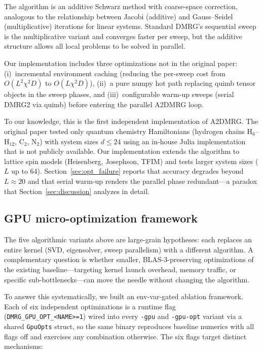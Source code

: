\documentclass[preprint,12pt]{elsarticle}
\begin{document}
The algorithm is an additive Schwarz method with coarse-space correction, analogous to the relationship between Jacobi (additive) and Gauss--Seidel (multiplicative) iterations for linear systems.
Standard DMRG's sequential sweep is the multiplicative variant and converges faster per sweep, but the additive structure allows all local problems to be solved in parallel.

Our implementation includes three optimizations not in the original paper:
(i)~incremental environment caching (reducing the per-sweep cost from $O(L^2 \chi^2 D)$ to $O(L \chi^2 D)$),
(ii)~a pure numpy hot path replacing quimb tensor objects in the sweep phases, and
(iii)~configurable warm-up sweeps (serial DMRG2 via quimb) before entering the parallel A2DMRG loop.

To our knowledge, this is the first independent implementation of A2DMRG.
The original paper \cite{Grigori2025} tested only quantum chemistry Hamiltonians (hydrogen chains H$_6$--H$_{12}$, C$_2$, N$_2$) with system sizes $d \leq 24$ using an in-house Julia implementation that is not publicly available.
Our implementation extends the algorithm to lattice spin models (Heisenberg, Josephson, TFIM) and tests larger system sizes ($L$ up to 64).
Section~\ref{sec:opt_failure} reports that accuracy degrades beyond $L \approx 20$ and that serial warm-up renders the parallel phase redundant---a paradox that Section~\ref{sec:discussion} analyzes in detail.

\subsection{GPU micro-optimization framework}
\label{sec:opt_framework}

The five algorithmic variants above are large-grain hypotheses: each replaces an entire kernel (SVD, eigensolver, sweep parallelism) with a different algorithm.
A complementary question is whether smaller, BLAS-3-preserving optimizations of the existing baseline---targeting kernel launch overhead, memory traffic, or specific sub-bottlenecks---can move the needle without changing the algorithm.

To answer this systematically, we built an env-var-gated ablation framework.
Each of six independent optimizations is a runtime flag (\texttt{DMRG\_GPU\_\allowbreak OPT\_<NAME>=1}) wired into every \texttt{-gpu} and \texttt{-gpu-opt} variant via a shared \texttt{GpuOpts} struct, so the same binary reproduces baseline numerics with all flags off and exercises any combination otherwise.
The six flags target distinct mechanisms:
\end{document}
